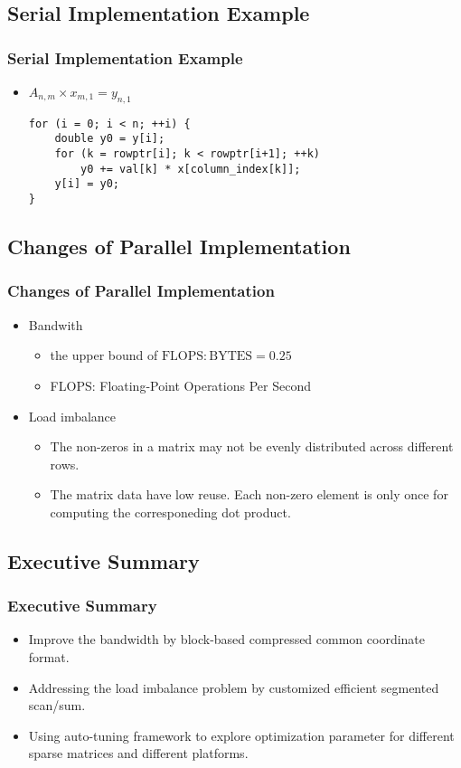 \subsection{Serial Implementation Example}
\begin{frame}[fragile]
	\frametitle{Serial Implementation Example}
	\begin{itemize}
		\item $A_{n,m} \times x_{m,1} = y_{n,1}$
\begin{lstlisting}
for (i = 0; i < n; ++i) {
    double y0 = y[i];
    for (k = rowptr[i]; k < rowptr[i+1]; ++k)
        y0 += val[k] * x[column_index[k]];
    y[i] = y0;
}
\end{lstlisting}
	\end{itemize}
\end{frame}

\subsection{Changes of Parallel Implementation}
\begin{frame}
	\frametitle{Changes of Parallel Implementation}
	\begin{itemize}
		\item Bandwith
			\begin{itemize}
				\item the upper bound of $\text{FLOPS}:\text{BYTES} = 0.25$
				\item FLOPS: Floating-Point Operations Per Second 
			\end{itemize}
		\item Load imbalance
			\begin{itemize}
				\item The non-zeros in a matrix may not be evenly distributed 
					across different rows.
				\item The matrix data have low reuse. Each non-zero element 
					is only once for computing the corresponeding dot product.
			\end{itemize}
	\end{itemize}
\end{frame}

\subsection{Executive Summary}
\begin{frame}
	\frametitle{Executive Summary}
	\begin{itemize}
		\item Improve the bandwidth by block-based compressed common
			coordinate format.
		\item Addressing the load imbalance problem by customized
			efficient segmented scan/sum.
		\item Using auto-tuning framework to explore optimization parameter 
			for different sparse matrices and different platforms.
	\end{itemize}
\end{frame}


